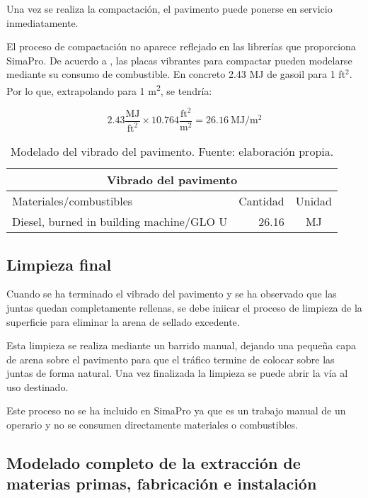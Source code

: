 Una vez se realiza la compactación, el pavimento puede ponerse en servicio inmediatamente.

El proceso de compactación no aparece reflejado en las librerías que proporciona SimaPro. De acuerdo a \cite{rieradevall}, las placas vibrantes para compactar pueden modelarse mediante su consumo de combustible. En concreto 2.43 \si{MJ} de gasoil para 1 ft$^2$. Por lo que, extrapolando para 1 \si{m^2}, se tendría:

\begin{equation}
\mathrm{2.43\frac{MJ}{{ft}^2} \times 10.764\frac{ft^2}{m^2}=26.16\ MJ/m^2}
\end{equation}

\begin{table}[!htb]
\centering
\begin{tabular}{p{8cm}rc}
\toprule
\multicolumn{3}{c}{Vibrado del pavimento}\\
\midrule
Materiales/combustibles & Cantidad & Unidad\\
\midrule
Diesel, burned in building machine/GLO U & 26.16 & \si{MJ}\\
\bottomrule
\end{tabular}
\caption[Modelado del vibrado del pavimento.]{Modelado del vibrado del pavimento. Fuente: elaboración propia.}
\label{modeladovibrado}
\end{table}

\subsection{Limpieza final}

Cuando se ha terminado el vibrado del pavimento y se ha observado que las juntas quedan completamente rellenas, se debe iniicar el proceso de limpieza de la superficie para eliminar la arena de sellado excedente.

Esta limpieza se realiza mediante un barrido manual, dejando una pequeña capa de arena sobre el pavimento para que el tráfico termine de colocar sobre las juntas de forma natural. Una vez finalizada la limpieza se puede abrir la vía al uso destinado.

Este proceso no se ha incluido en SimaPro ya que es un trabajo manual de un operario y no se consumen directamente materiales o combustibles.

\subsection{Modelado completo de la extracción de materias primas, fabricación e instalación}\label{sec:modeladofabricacion}


